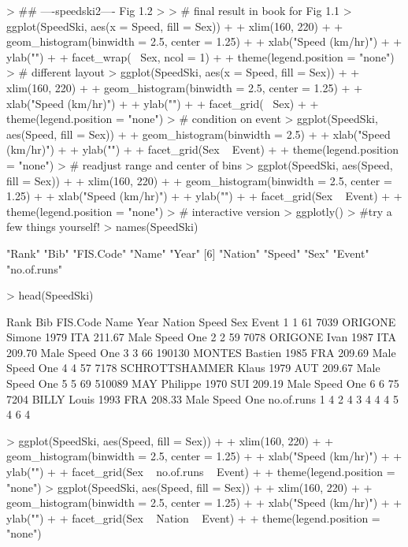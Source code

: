 \documentclass[12pt,letterpaper,final]{article}
\begin{document}
\begin{Schunk}
\begin{Sinput}
> ## ----speedski2---- Fig 1.2
> 
> # final result in book for Fig 1.1
> ggplot(SpeedSki, aes(x = Speed, fill = Sex)) + 
+   xlim(160, 220) +
+   geom_histogram(binwidth = 2.5, center = 1.25) + 
+   xlab("Speed (km/hr)") + 
+   ylab("") +
+   facet_wrap(~ Sex, ncol = 1) + 
+   theme(legend.position = "none")
> # different layout
> ggplot(SpeedSki, aes(x = Speed, fill = Sex)) + 
+   xlim(160, 220) +
+   geom_histogram(binwidth = 2.5, center = 1.25) + 
+   xlab("Speed (km/hr)") + 
+   ylab("") +
+   facet_grid(~ Sex) + 
+   theme(legend.position = "none")
> # condition on event
> ggplot(SpeedSki, aes(Speed, fill = Sex)) +
+   geom_histogram(binwidth = 2.5)  + 
+   xlab("Speed (km/hr)") +
+   ylab("") + 
+   facet_grid(Sex ~ Event) +
+   theme(legend.position = "none")
> # readjust range and center of bins
> ggplot(SpeedSki, aes(Speed, fill = Sex)) +
+   xlim(160, 220) +
+   geom_histogram(binwidth = 2.5, center = 1.25)  + 
+   xlab("Speed (km/hr)") +
+   ylab("") + 
+   facet_grid(Sex ~ Event) +
+   theme(legend.position = "none")
> # interactive version
> ggplotly()
> #try a few things yourself!
> names(SpeedSki)
\end{Sinput}
\begin{Soutput}
 [1] "Rank"       "Bib"        "FIS.Code"   "Name"       "Year"      
 [6] "Nation"     "Speed"      "Sex"        "Event"      "no.of.runs"
\end{Soutput}
\begin{Sinput}
> head(SpeedSki)
\end{Sinput}
\begin{Soutput}
  Rank Bib FIS.Code                 Name Year Nation  Speed  Sex     Event
1    1  61     7039       ORIGONE Simone 1979    ITA 211.67 Male Speed One
2    2  59     7078         ORIGONE Ivan 1987    ITA 209.70 Male Speed One
3    3  66   190130       MONTES Bastien 1985    FRA 209.69 Male Speed One
4    4  57     7178 SCHROTTSHAMMER Klaus 1979    AUT 209.67 Male Speed One
5    5  69   510089         MAY Philippe 1970    SUI 209.19 Male Speed One
6    6  75     7204          BILLY Louis 1993    FRA 208.33 Male Speed One
  no.of.runs
1          4
2          4
3          4
4          4
5          4
6          4
\end{Soutput}
\begin{Sinput}
> ggplot(SpeedSki, aes(Speed, fill = Sex)) +
+   xlim(160, 220) +
+   geom_histogram(binwidth = 2.5, center = 1.25)  + 
+   xlab("Speed (km/hr)") +
+   ylab("") + 
+   facet_grid(Sex ~ no.of.runs ~ Event) +
+   theme(legend.position = "none")
> ggplot(SpeedSki, aes(Speed, fill = Sex)) +
+   xlim(160, 220) +
+   geom_histogram(binwidth = 2.5, center = 1.25)  + 
+   xlab("Speed (km/hr)") +
+   ylab("") + 
+   facet_grid(Sex ~ Nation ~ Event) +
+   theme(legend.position = "none")
\end{Sinput}
\end{Schunk}
\end{document}
